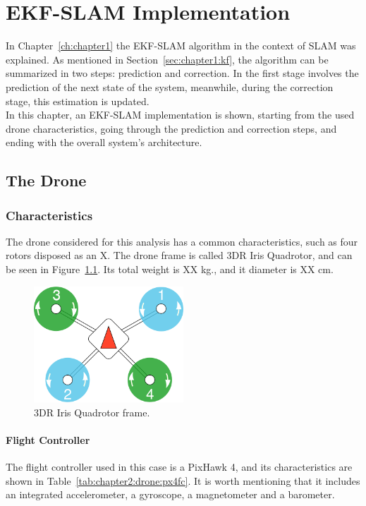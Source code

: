 \chapter{EKF-SLAM Implementation}
\label{ch:chapter2}
In Chapter~\ref{ch:chapter1} the EKF-SLAM algorithm in the context of SLAM was explained. As mentioned in Section~\ref{sec:chapter1:kf}, the algorithm can be summarized in two steps: prediction and correction. In the first stage involves the prediction of the next state of the system, meanwhile, during the correction stage, this estimation is updated. \\

In this chapter, an EKF-SLAM implementation is shown, starting from the used drone characteristics, going through the prediction and correction steps, and ending with the overall system's architecture.

\section{The Drone}
\label{sec:chapter2:drone}
\subsection{Characteristics}
\label{subsec:chapter2:drone:characteristics}
The drone considered for this analysis has a common characteristics, such as four rotors disposed as an X. The drone frame is called 3DR Iris Quadrotor, and can be seen in Figure~\ref{fig:chapter2:drone:frame}. Its total weight is XX kg., and it diameter is XX cm.\\

\begin{figure}[h]
    \centering
    \includegraphics[width=0.5\textwidth]{Figures/fig4-quad-frame.png}
    \caption{3DR Iris Quadrotor frame.}
    \label{fig:chapter2:drone:frame}
\end{figure}

\subsubsection{Flight Controller}
The flight controller used in this case is a PixHawk 4, and its characteristics are shown in Table~\ref{tab:chapter2:drone:px4fc}. It is worth mentioning that it includes an integrated accelerometer, a gyroscope, a magnetometer and a barometer.

